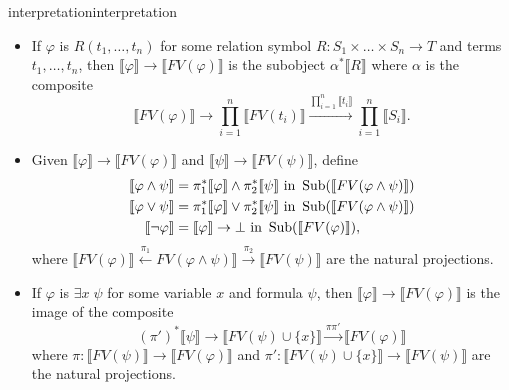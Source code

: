 \begin{topic}{interpretation}{interpretation}
\begin{itemize}
\[\begin{tikzcd}[column sep=4em]
        \end{tikzcd} \]
        where $\pi \colon \llbracket FV(\varphi) \rrbracket \to \llbracket FV(t) \rrbracket$ and $\pi' \colon \llbracket FV(\varphi) \rrbracket \to \llbracket FV(s) \rrbracket$ are the projections.
        \item If $\varphi$ is $R(t_1, \ldots, t_n)$ for some relation symbol $R \colon S_1 \times \ldots \times S_n \to T$ and terms $t_1, \ldots, t_n$, then $\llbracket \varphi \rrbracket \to \llbracket FV(\varphi) \rrbracket$ is the subobject $\alpha^* \llbracket R \rrbracket$ where $\alpha$ is the composite
        \[ \llbracket FV(\varphi) \rrbracket \to \prod_{i = 1}^{n} \llbracket FV(t_i) \rrbracket \xrightarrow{\prod_{i = 1}^{n} \llbracket t_i \rrbracket} \prod_{i = 1}^{n} \llbracket S_i \rrbracket . \]
        \item Given $\llbracket \varphi \rrbracket \to \llbracket FV(\varphi) \rrbracket$ and $\llbracket \psi \rrbracket \to \llbracket FV(\psi) \rrbracket$, define
        \[ \begin{aligned}
            \llbracket \varphi \land \psi \rrbracket &= \pi_1^* \llbracket \varphi \rrbracket \land \pi_2^* \llbracket \psi \rrbracket \textup{ in } \operatorname{Sub}(\llbracket FV(\varphi \land \psi) \rrbracket) \\
            \llbracket \varphi \lor \psi \rrbracket &= \pi_1^* \llbracket \varphi \rrbracket \lor \pi_2^* \llbracket \psi \rrbracket \textup{ in } \operatorname{Sub}(\llbracket FV(\varphi \land \psi) \rrbracket) \\
            \llbracket \neg \varphi \rrbracket &= \llbracket \varphi \rrbracket \to \bot \textup{ in } \operatorname{Sub}(\llbracket FV(\varphi) \rrbracket) ,
        \end{aligned} \]
        where $\llbracket FV(\varphi) \rrbracket \xleftarrow{\pi_1} FV(\varphi \land \psi) \rrbracket \xrightarrow{\pi_2} \llbracket FV(\psi) \rrbracket$ are the natural projections.
        \item If $\varphi$ is $\exists x \; \psi$ for some variable $x$ and formula $\psi$, then $\llbracket \varphi \rrbracket \to \llbracket FV(\varphi) \rrbracket$ is the image of the composite
        \[ (\pi')^* \llbracket \psi \rrbracket \to \llbracket FV(\psi) \cup \{ x \} \rrbracket \xrightarrow{\pi \pi'} \llbracket FV(\varphi) \rrbracket \]
        where $\pi \colon \llbracket FV(\psi) \rrbracket \to \llbracket FV(\varphi) \rrbracket$ and $\pi' \colon \llbracket FV(\psi) \cup \{ x \} \rrbracket \to \llbracket FV(\psi) \rrbracket$ are the natural projections.

\end{itemize}
\end{topic}
